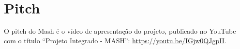 \section{Pitch}

O pitch do Mash é o vídeo de apresentação do projeto, publicado no YouTube com o título ``Projeto Integrado - MASH'': \url{https://youtu.be/IGjw0QJgpII}.
